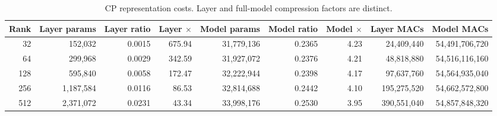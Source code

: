 \begin{table}
\centering
\caption{CP representation costs. Layer and full-model compression factors are distinct.}
\label{tab:final-cp-costs}
\begin{tabular}{rrrrrrrrr}
\toprule
Rank & Layer params & Layer ratio & Layer $\times$ & Model params & Model ratio & Model $\times$ & Layer MACs & Model MACs \\
\midrule
32 & 152,032 & 0.0015 & 675.94 & 31,779,136 & 0.2365 & 4.23 & 24,409,440 & 54,491,706,720 \\
64 & 299,968 & 0.0029 & 342.59 & 31,927,072 & 0.2376 & 4.21 & 48,818,880 & 54,516,116,160 \\
128 & 595,840 & 0.0058 & 172.47 & 32,222,944 & 0.2398 & 4.17 & 97,637,760 & 54,564,935,040 \\
256 & 1,187,584 & 0.0116 & 86.53 & 32,814,688 & 0.2442 & 4.10 & 195,275,520 & 54,662,572,800 \\
512 & 2,371,072 & 0.0231 & 43.34 & 33,998,176 & 0.2530 & 3.95 & 390,551,040 & 54,857,848,320 \\
\bottomrule
\end{tabular}
\end{table}
